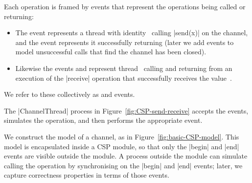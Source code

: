 Each operation is framed by events that represent the operations being called
or returning:
%
\begin{itemize}
\item The event  represents a thread with
  identity~ calling |send(x)| on the channel, and the event
   represents it successfully returning (later we
  add events to model unsuccessful calls that find the channel has
  been closed).

\item Likewise the events  and
   represent thread~ calling and
  returning from an execution of the |receive| operation that successfully
  receives the value~.
\end{itemize}
%
We refer to these collectively as  and  events.

%

The |ChannelThread| process in Figure~\ref{fig:CSP-send-receive} accepts the
 events, simulates the operation, and then performs the
appropriate  event.

We construct the model of a channel, as in Figure~\ref{fig:basic-CSP-model}.
This model is encapsulated inside a CSP module, so that only the |begin| and
|end| events are visible outside the module.  A process outside the module can
simulate calling the operation by synchronising on the |begin| and |end|
events; later, we capture correctness properties in terms of those events.




